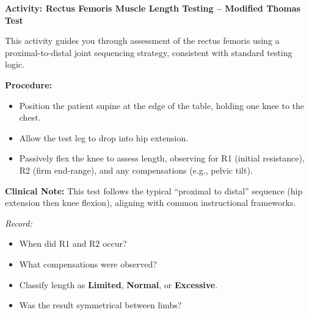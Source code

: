 \begin{labactivitybox}
\textbf{Activity: Rectus Femoris Muscle Length Testing – Modified Thomas Test}

This activity guides you through assessment of the rectus femoris using a proximal-to-distal joint sequencing strategy, consistent with standard testing logic.

\textbf{Procedure:}
\begin{itemize}
  \item Position the patient supine at the edge of the table, holding one knee to the chest.
  \item Allow the test leg to drop into hip extension.
  \item Passively flex the knee to assess length, observing for R1 (initial resistance), R2 (firm end-range), and any compensations (e.g., pelvic tilt).
\end{itemize}

\textbf{Clinical Note:} This test follows the typical “proximal to distal” sequence (hip extension then knee flexion), aligning with common instructional frameworks.

\textit{Record:}
\begin{itemize}
  \item When did R1 and R2 occur?
  \item What compensations were observed?
  \item Classify length as \textbf{Limited}, \textbf{Normal}, or \textbf{Excessive}.
  \item Was the result symmetrical between limbs?
\end{itemize}
\end{labactivitybox}

